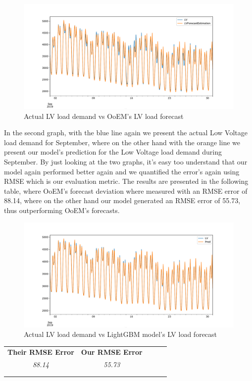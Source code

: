\begin{figure}[ht!]
\centering
\includegraphics[width=1\linewidth]{project/1.pdf}
\caption{Actual LV load demand vs OoEM’s LV load forecast}

\end{figure}
In the second graph, with the blue line again we present the actual Low Voltage load demand for September, where on the other hand with the orange line we present our model's prediction for the Low Voltage load demand during September. By just looking at the two graphs, it's easy too understand that our model again performed better again and we quantified the error's again using RMSE which is our evaluation metric. The results are presented in the following table, where OoEM's forecast deviation where measured with an RMSE error of 88.14, where on the other hand our model generated an RMSE error of 55.73, thus outperforming OoEM's forecasts.
\begin{figure}[ht!]
\centering
\includegraphics[width=1\linewidth]{project/2.pdf}
\caption{Actual LV load demand vs LightGBM model's LV load forecast}

\end{figure}
\begin{table}[ht!]
\centering
\begin{tabular}{lllll}
\cline{1-2}
\multicolumn{1}{|l|}{\textbf{Their RMSE Error}} & \multicolumn{1}{l|}{\textbf{Our RMSE Error}} &  &  &  \\ \cline{1-2}
\multicolumn{1}{|c|}{\textit{88.14}} & \multicolumn{1}{c|}{\textit{55.73}} &  &  &  \\ \cline{1-2}
                                &                                &  &  &  \\
                                &                                &  &  & 
\end{tabular}
\end{table}
